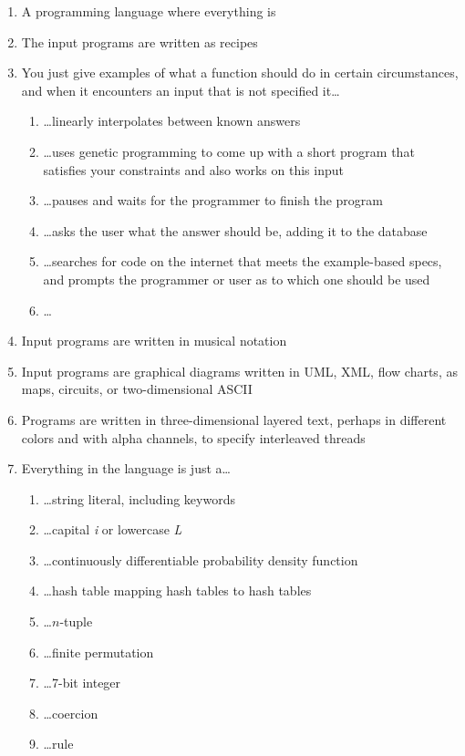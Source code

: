 \documentclass[acmtocl]%
{boviktrans}
\begin{document}
\begin{enumerate}
\item A programming language where everything is
\item The input programs are written as recipes
\item You just give examples of what a function should do in certain circumstances, and when it encounters an input that is not specified it\ldots
  \begin{enumerate}
    \item \ldots linearly interpolates between known answers
    \item \ldots uses genetic programming to come up with a short program that satisfies your constraints and also works on this input
    \item \ldots pauses and waits for the programmer to finish the program
    \item \ldots asks the user what the answer should be, adding it to the database
    \item \ldots searches for code on the internet that meets the example-based specs, and prompts the programmer or user as to which one should be used
    \item \ldots
  \end{enumerate}
\item Input programs are written in musical notation
\item Input programs are graphical diagrams written in UML, XML, flow charts, as maps, circuits, or two-dimensional ASCII
\item Programs are written in three-dimensional layered text, perhaps in different colors and with alpha channels, to specify interleaved threads
\item Everything in the language is just a\ldots
   \begin{enumerate}
     \item \ldots string literal, including keywords
     \item \ldots capital {\it i} or lowercase {\it L}
     \item \ldots continuously differentiable probability density function
     \item \ldots hash table mapping hash tables to hash tables
     \item \ldots $n$-tuple
     \item \ldots finite permutation
     \item \ldots 7-bit integer
     \item \ldots coercion
     \item \ldots rule

\end{enumerate}
\end{enumerate}
\end{document}
